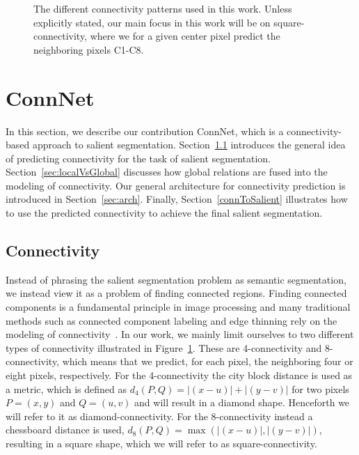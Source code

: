 \documentclass[journal]{IEEEtran}
\begin{document}
\begin{figure}[t]
\centering
{}\hspace{1cm}
\caption{The different connectivity patterns used in this work. Unless explicitly stated, our main focus in this work will be on square-connectivity, where we for a given center pixel predict the neighboring pixels C1-C8.}
\label{fig:conn48}
\end{figure}


\section{ConnNet}
\label{ref:method}

In this section, we describe our contribution ConnNet, which is a connectivity-based approach to salient segmentation.
Section~\ref{sec:conn} introduces the general idea of predicting connectivity for the task of salient segmentation. Section~\ref{sec:localVsGlobal} discusses how global relations are fused into the modeling of connectivity. Our general architecture for connectivity prediction is introduced in Section~\ref{sec:arch}. Finally, Section~\ref{connToSalient} illustrates how to use the predicted connectivity to achieve the final salient segmentation.

\subsection{Connectivity}
\label{sec:conn}

Instead of phrasing the salient segmentation problem as semantic segmentation, we instead view it as a problem of finding connected regions. Finding connected components is a fundamental principle in image processing and many traditional methods such as connected component labeling and edge thinning rely on the modeling of connectivity~\cite{gonzalezdigital}. In our work, we mainly limit ourselves to two different types of connectivity illustrated in Figure~\ref{fig:conn48}. These are 4-connectivity and 8-connectivity, which means that we predict, for each pixel, the neighboring four or eight pixels, respectively. For the 4-connectivity the city block distance is used as a metric, which is defined as $d_4(P,Q)=|(x-u)|+|(y-v)|$ for two pixels $P=(x,y)$ and $Q=(u,v)$ and will result in a diamond shape. Henceforth we will refer to it as diamond-connectivity. For the 8-connectivity instead a chessboard distance is used, $d_8(P,Q)=\max(|(x-u)|,|(y-v)|)$, resulting in a square shape, which we will refer to as square-connectivity.
\end{document}
